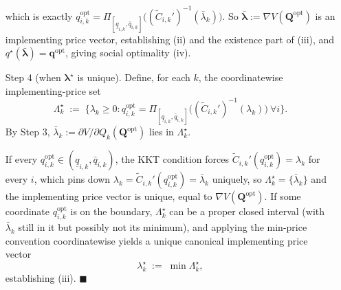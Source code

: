 \documentclass{article}
\begin{document}
\begin{enumerate}
which is exactly $q_{i,k}^{\mathrm{opt}} = \Pi_{[\underline q_{i,k}, \bar q_{i,k}]}\!\big((\widetilde C_{i,k}')^{-1}(\bar\lambda_k)\big)$. So $\bar{\boldsymbol\lambda} := \nabla V(\mathbf Q^{\mathrm{opt}})$ is an implementing price vector, establishing (ii) and the existence part of (iii), and $q^\star(\bar{\boldsymbol\lambda}) = \mathbf q^{\mathrm{opt}}$, giving social optimality (iv).
    \item[Step 4] (when $\boldsymbol\lambda^\star$ is unique). Define, for each $k$, the coordinatewise implementing-price set
$$\Lambda_k^\star \;:=\; \big\{\lambda_k \ge 0 : q_{i,k}^{\mathrm{opt}} = \Pi_{[\underline q_{i,k}, \bar q_{i,k}]}\!\big((\widetilde C_{i,k}')^{-1}(\lambda_k)\big) \ \forall i\big\}.$$
By Step 3, $\bar\lambda_k := \partial V/\partial Q_k(\mathbf Q^{\mathrm{opt}})$ lies in $\Lambda_k^\star$.

If every $q_{i,k}^{\mathrm{opt}} \in (\underline q_{i,k}, \bar q_{i,k})$, the KKT condition forces $\widetilde C_{i,k}'(q_{i,k}^{\mathrm{opt}}) = \lambda_k$ for every $i$, which pins down $\lambda_k = \widetilde C_{i,k}'(q_{i,k}^{\mathrm{opt}}) = \bar\lambda_k$ uniquely, so $\Lambda_k^\star = \{\bar\lambda_k\}$ and the implementing price vector is unique, equal to $\nabla V(\mathbf Q^{\mathrm{opt}})$. If some coordinate $q_{i,k}^{\mathrm{opt}}$ is on the boundary, $\Lambda_k^\star$ can be a proper closed interval (with $\bar\lambda_k$ still in it but possibly not its minimum), and applying the min-price convention coordinatewise yields a unique canonical implementing price vector
$$\lambda_k^\star \;:=\; \min \Lambda_k^\star,$$
establishing (iii). $\blacksquare$
\end{enumerate}
\end{document}
